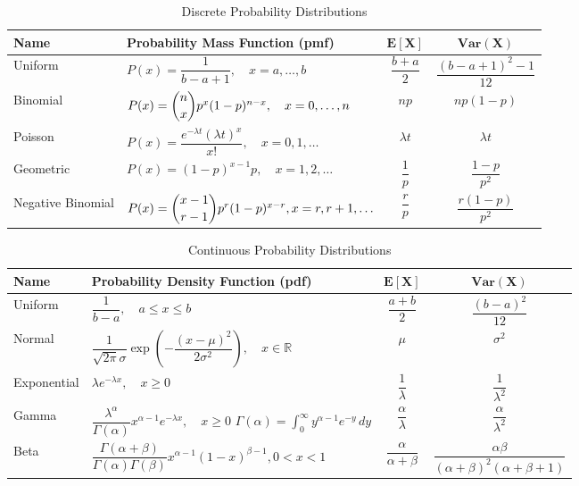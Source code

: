 \documentclass[12pt]{book}
\begin{document}
\begin{table}[h]
\caption{Discrete Probability Distributions}
\label{tab:distributions}
\begin{tabularx}{\linewidth}{@{} l X c c @{}}  %
\toprule
\textbf{Name} & \textbf{Probability Mass Function (pmf)} & $\mathbf{E[X]}$ & $\mathbf{\text{Var}(X)}$ \\
\midrule
Uniform &
$P(x) = \dfrac{1}{b - a + 1}, \quad x = a, \ldots, b$ &
$\dfrac{b + a}{2}$ &
$\dfrac{(b - a + 1)^2 - 1}{12}$ \\
\addlinespace[2pt]
Binomial &
$P(x) = \dbinom{n}{x} p^x (1 - p)^{n - x}, \quad x = 0, \ldots, n$ &
$n p$ &
$n p (1 - p)$ \\
\addlinespace[2pt]
Poisson &
$P(x) = \dfrac{e^{-\lambda t} (\lambda t)^x}{x!}, \quad x = 0, 1, \ldots$ &
$\lambda t$ &
$\lambda t$ \\
\addlinespace[2pt]
Geometric &
$P(x) = (1 - p)^{x - 1} p, \quad x = 1, 2, \ldots$ &
$\dfrac{1}{p}$ &
$\dfrac{1 - p}{p^2}$ \\
\addlinespace[2pt]
Negative Binomial &
$P(x) = \dbinom{x - 1}{r - 1} p^r (1 - p)^{x - r}, x = r, r+1, \ldots$ &
$\dfrac{r}{p}$ &
$\dfrac{r (1 - p)}{p^2}$ \\
\bottomrule
\end{tabularx}
\end{table}

\begin{table}[htbp]
\centering
\caption{Continuous Probability Distributions}
\label{tab:continuous_dist}
\begin{tabularx}{\linewidth}{@{} l X c c @{}}  %
\toprule
\textbf{Name} & \textbf{Probability Density Function (pdf)} & $\mathbf{E[X]}$ & $\mathbf{Var(X)}$ \\
\midrule
Uniform & 
$\dfrac{1}{b-a},\quad a \leq x \leq b$ & 
$\dfrac{a+b}{2}$ & 
$\dfrac{(b-a)^2}{12}$ \\
\addlinespace[3pt]
Normal & 
$\dfrac{1}{\sqrt{2\pi}\sigma}\exp\left(-\dfrac{(x-\mu)^2}{2\sigma^2}\right),\quad x \in \mathbb{R}$ & 
$\mu$ & 
$\sigma^2$ \\
\addlinespace[3pt]
Exponential & 
$\lambda e^{-\lambda x},\quad x \geq 0$ & 
$\dfrac{1}{\lambda}$ & 
$\dfrac{1}{\lambda^2}$ \\
\addlinespace[3pt]
Gamma & 
$\dfrac{\lambda^\alpha}{\Gamma(\alpha)}x^{\alpha-1}e^{-\lambda x},\quad x \geq 0$ \newline
$\Gamma(\alpha) = \displaystyle\int_0^\infty y^{\alpha-1}e^{-y}\,dy$ & 
$\dfrac{\alpha}{\lambda}$ & 
$\dfrac{\alpha}{\lambda^2}$ \\
\addlinespace[3pt]
Beta & 
$\dfrac{\Gamma(\alpha+\beta)}{\Gamma(\alpha)\Gamma(\beta)}x^{\alpha-1}(1-x)^{\beta-1},0 < x < 1$ & 
$\dfrac{\alpha}{\alpha+\beta}$ & 
$\dfrac{\alpha\beta}{(\alpha+\beta)^2(\alpha+\beta+1)}$ \\
\bottomrule
\end{tabularx}
\end{table}
 
\end{document}
